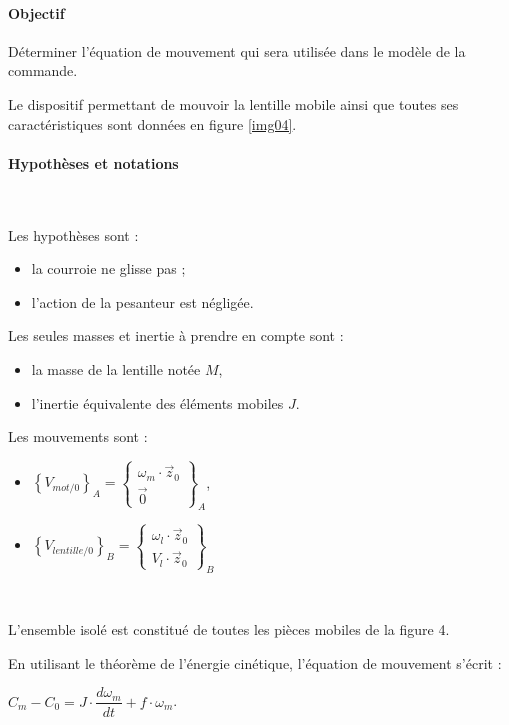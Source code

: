 \paragraph{Objectif}

Déterminer l'équation de mouvement qui sera utilisée dans le modèle de la commande.

Le dispositif permettant de mouvoir la lentille mobile ainsi que toutes ses caractéristiques sont données en figure \ref{img04}.

\paragraph{Hypothèses et notations} ~\

Les hypothèses sont :
\begin{itemize}
 \item la courroie ne glisse pas ;
 \item l'action de la pesanteur est négligée.
\end{itemize}

Les seules masses et inertie à prendre en compte sont :
\begin{itemize}
 \item la masse de la lentille notée $M$,
 \item l'inertie équivalente des éléments mobiles $J$.
\end{itemize}

Les mouvements sont :
\begin{itemize}
 \item $\left\{V_{mot/0}\right\}_A=\left\{\begin{array}{c}
 \omega_m\cdot\vec{z}_0 \\
 \vec{0} 
 \end{array}\right\}_A$,
 \item $\left\{V_{lentille/0}\right\}_B=\left\{\begin{array}{c}
 \omega_l\cdot\vec{z}_0 \\
 V_l\cdot\vec{z}_0
 \end{array}\right\}_B$
\end{itemize}


~\

L'ensemble isolé est constitué de toutes les pièces mobiles de la figure 4.

En utilisant le théorème de l'énergie cinétique, l'équation de mouvement s'écrit :
\begin{center}
$C_m-C_0=J\cdot\dfrac{d\omega_m}{dt}+f\cdot\omega_m$.
\end{center}


